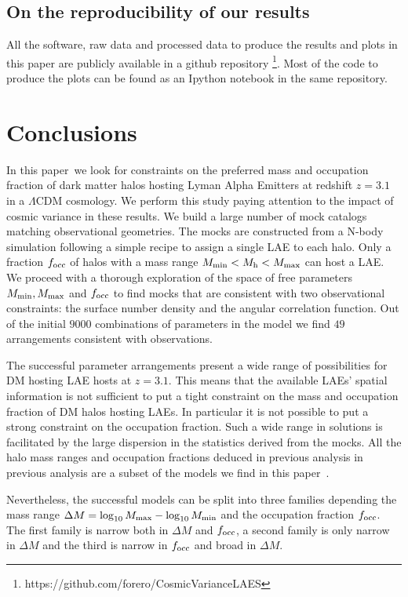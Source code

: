 \documentclass[usenatbib]{mn2e}
\newcommand{\documentname}{paper~}
\begin{document}
\subsection{On the reproducibility of our results}

All the software, raw data and processed data to produce the results
and plots in this paper are publicly available in a github
repository \footnote{https://github.com/forero/CosmicVarianceLAES}. Most
of the code to produce the plots can be found as an Ipython notebook
\citep{IPython} in the same repository.


\section{Conclusions}
\label{sec:conclusions}

In this \documentname we look for constraints on the preferred mass
and occupation fraction of dark matter halos hosting Lyman Alpha Emitters at
redshift $z=3.1$ in a $\Lambda$CDM cosmology. We perform this study
paying attention to the impact of cosmic variance in these results. We
build a large number of mock catalogs matching observational
geometries. The mocks are constructed from a N-body simulation
following a simple recipe to assign a single LAE to each halo. Only
a fraction $f_{\rm occ}$ of halos with a mass range  $M_{\rm
  min}<M_{\rm h}<M_{\rm   max}$ can host a LAE. We proceed with a
thorough exploration of the space of free parameters $M_{\rm min},
M_{\rm max}$ and $f_{\rm occ}$ to find mocks that are consistent with
two observational constraints: the surface number density and the
angular correlation function. Out of the initial $9000$ 
combinations of parameters in the model we find $49$ arrangements
consistent with observations.


The successful parameter arrangements present a wide range of possibilities for
DM hosting LAE hosts at $z=3.1$. This means that the available LAEs' spatial
information is not sufficient to put a tight constraint on the mass
and occupation fraction of DM halos hosting LAEs. In particular it is
not possible to put a strong constraint on the occupation
fraction. Such a wide range in solutions is facilitated by the large
dispersion in the statistics derived from the mocks. All the halo mass
ranges and occupation fractions deduced in previous analysis in
previous analysis \citep[i.e.][]{Gawiser2007,Ouchi2010} are a subset of the
models we find in this \documentname.  
 

Nevertheless, the successful models can be split into three families
depending the mass range $\Delta M=\log_{10}M_{\rm max} -
\log_{10}M_{\rm min}$ and the occupation fraction $f_{\rm occ}$. The
first family is narrow both in $\Delta M$ and $f_{\rm occ}$, a second
family is only narrow in $\Delta M$ and the third is narrow in $f_{\rm
  occ}$ and broad in $\Delta M$. 
\end{document}
